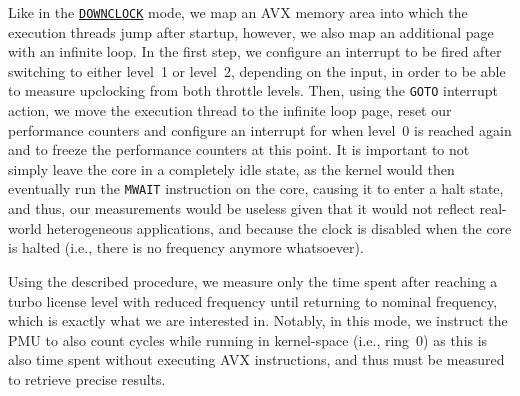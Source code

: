 Like in the \hyperref[sec:analysis:design:measurementmodes:downclock]{\texttt{DOWNCLOCK}} mode, we map an \gls{AVX} memory area into which the execution threads jump after startup, however, we also map an additional page with an infinite loop. In the first step, we configure an interrupt to be fired after switching to either level~1 or level~2, depending on the input, in order to be able to measure upclocking from both throttle levels. Then, using the \texttt{GOTO} interrupt action, we move the execution thread to the infinite loop page, reset our performance counters and configure an interrupt for when level~0 is reached again and to freeze the performance counters at this point. It is important to not simply leave the core in a completely idle state, as the kernel would then eventually run the \texttt{MWAIT} \cite{intelsdminstructionreference} instruction on the core, causing it to enter a halt state, and thus, our measurements would be useless given that it would not reflect real-world heterogeneous applications, and because the clock is disabled when the core is halted (i.e., there is no frequency anymore whatsoever).

Using the described procedure, we measure only the time spent after reaching a turbo license level with reduced frequency until returning to nominal frequency, which is exactly what we are interested in. Notably, in this mode, we instruct the \gls{PMU} to also count cycles while running in kernel-space (i.e., ring~$0$) as this is also time spent without executing \gls{AVX} instructions, and thus must be measured to retrieve precise results.

